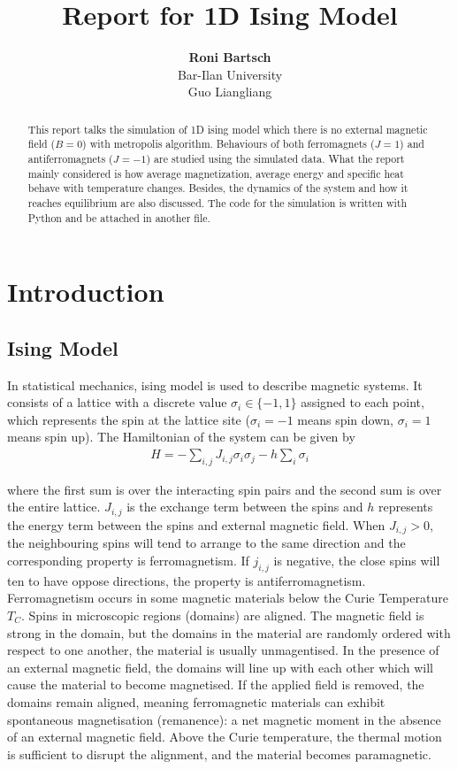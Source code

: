 \documentclass[12pt]{article}
\title{\Large{\textbf{Report for 1D Ising Model\\}}}
\author{\textbf{Roni Bartsch}\\
	Bar-Ilan University\\Guo Liangliang}
\date{}
\begin{document}
	\maketitle
	
	\begin{abstract}
		This report talks the simulation of 1D ising model which there is no external magnetic field ($B=0$) with metropolis algorithm. Behaviours of both ferromagnets ($J=1$) and antiferromagnets ($J=-1$) are studied using the simulated data. What the report mainly considered is how  average magnetization, average energy and specific heat behave with temperature changes. Besides, the dynamics of the system and how it reaches equilibrium are also discussed. The code for the simulation is written with Python and be attached in another file.
	\end{abstract}
	
	\section{Introduction}
	\label{sec: introduction} 
	
	\subsection{Ising Model}
	\label{sec: ising model}
	In statistical mechanics, ising model is used to describe magnetic systems. It consists of a lattice with a discrete value $\sigma _i  \in \{-1,1\}$ assigned to each point, which represents the spin at the lattice site ($\sigma_i=-1$ means spin down, $\sigma_i=1$ means spin up). The Hamiltonian of the system can be given by 
	\begin{align}\label{equ: hamiltonian of ising model}
		H=-\sum_{i,j}J_{i,j}\sigma_i \sigma _j -h \sum_i \sigma_i
	\end{align}
	
	where the first sum is over the interacting spin pairs and the second sum is over the entire lattice. $J_{i,j}$ is the exchange term between the spins and $h$ represents the energy term between the spins and external magnetic field. When $J_{i,j}>0$, the neighbouring spins will tend to arrange to the same direction and the corresponding property is ferromagnetism. If $j_{i,j}$ is negative, the close spins will ten to have oppose directions, the property is antiferromagnetism.  Ferromagnetism occurs in some magnetic materials below the Curie Temperature $T_C$. Spins in microscopic regions (domains) are aligned. The magnetic field is strong in the domain, but the domains in the material are randomly ordered with respect to one another, the material is usually unmagentised. In the presence of an external magnetic field, the domains will line up with each other which will cause the material to become magnetised.  If the applied field is removed, the domains remain aligned, meaning ferromagnetic materials can exhibit spontaneous magnetisation (remanence): a net magnetic moment in the absence of an external magnetic field. Above the Curie temperature, the thermal motion is sufficient to disrupt the alignment, and the material becomes paramagnetic. 
	
\end{document}
